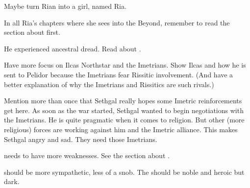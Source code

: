 \begin{changes}
    Maybe turn Rian into a girl, named Ria.
    
    In all Ria's chapters where she sees into the Beyond, remember to read the section about  first.

    He experienced ancestral dread.
    Read about .
  
  \begin{comment}\paragraph{Telcastora Ilcas}\end{comment}
    Have more focus on Ilcas Northstar and the Imetrians. 
    Show Ilcas and how he is sent to Pelidor because the Imetrians fear Rissitic involvement. 
    (And have a better explanation of why the Imetrians and Rissitics are such rivals.)
  
  \begin{comment}
    \paragraph{Sethgal}
  \end{comment}
    Mention more than once that Sethgal really hopes some Imetric reinforcements get here.
    As soon as the war started, Sethgal wanted to begin negotiations with the Imetrians. 
    He is quite pragmatic when it comes to religion.
    But other (more religious) forces are working against him and the Imetric alliance.
    This makes Sethgal angry and sad.
    They need those Imetrians. 
  
  \begin{comment}
    \paragraph{\Teshrial}
  \end{comment}
  \changesitem{\Teshrial}
    \Teshrial needs to have more weaknesses.
    See the section about . 
    
    \Teshrial should be more sympathetic, less of a snob.
    The \resphain should be noble and heroic but dark.
\end{changes}





